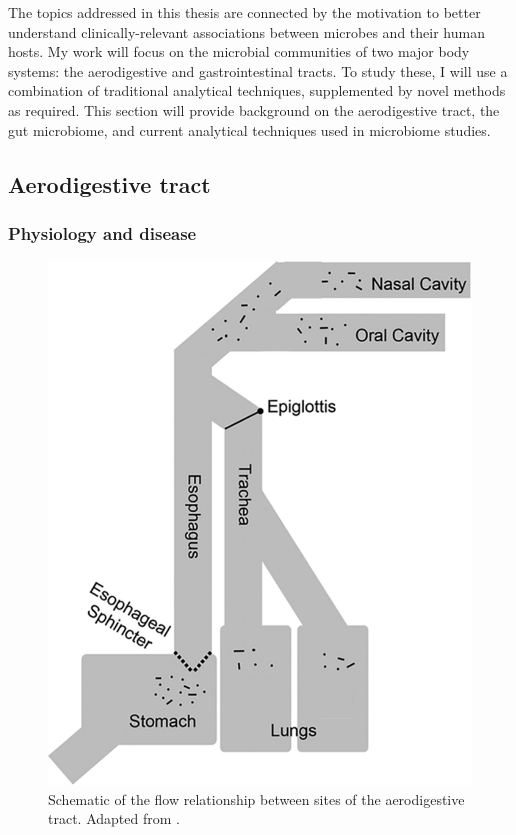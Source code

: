 \documentclass[12pt]{article}
\begin{document}
The topics addressed in this thesis are connected by
the motivation to better understand
clinically-relevant associations between microbes and their human hosts.
My work will focus on the microbial communities of two major body systems:
the aerodigestive and gastrointestinal tracts. To study these, I will 
use a combination of traditional analytical techniques, supplemented by 
novel methods as required. This section will provide background on
the aerodigestive tract, the gut microbiome, and current analytical techniques 
used in microbiome studies. 

\subsection{Aerodigestive tract}

\subsubsection{Physiology and disease}

\begin{figure}
\begin{center}
    \includegraphics[scale=0.35]{aero_tract}
    \caption{Schematic of the flow relationship between sites of the 
    aerodigestive tract. Adapted from \cite{bassis-source-2015}.}\label{fig:aero_tract}
\end{center}
\end{figure}
\end{document}
